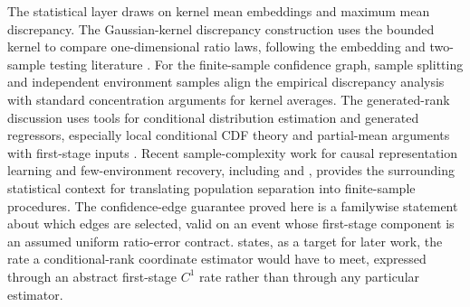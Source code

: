 The statistical layer draws on kernel mean embeddings and maximum mean discrepancy. The Gaussian-kernel discrepancy construction uses the bounded kernel \leanref{sym:k(exp (-(a-b)^2), range (0,1])}{\ensuremath{k(a,b)=\exp(-(a-b)^2)}} to compare one-dimensional ratio laws, following the embedding and two-sample testing literature \citep{Sriperumbudur2010,Sriperumbudur2011,Gretton2007,Smola2007,GrettonEtAl2012KernelTwoSample,SchrabEtAl2023MMDAgg}. For the finite-sample confidence graph, sample splitting and independent environment samples align the empirical discrepancy analysis with standard concentration arguments for kernel averages. The generated-rank discussion uses tools for conditional distribution estimation and generated regressors, especially local conditional CDF theory and partial-mean arguments with first-stage inputs \citep{Xie2023UniformConditionalCDF,MammenRotheSchienle2012GeneratedCovariates,Lee2018PartialMeanGeneratedRegressors}. Recent sample-complexity work for causal representation learning and few-environment recovery, including \citet{AcarturkEtAl2024SampleComplexityCRL} and \citet{LeeJinAragam2026FewEnvironments}, provides the surrounding statistical context for translating population separation into finite-sample procedures. The confidence-edge guarantee proved here is a familywise statement about which edges are selected, valid on an event whose first-stage component is an assumed uniform ratio-error contract.  states, as a target for later work, the rate a conditional-rank coordinate estimator would have to meet, expressed through an abstract first-stage \(C^1\) rate rather than through any particular estimator.
